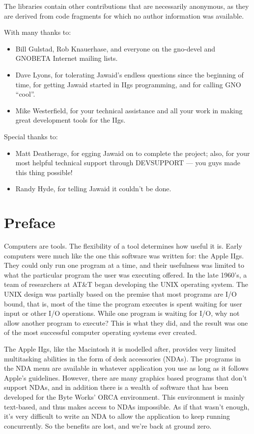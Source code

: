 \documentclass{report}
\begin{document}
The libraries contain other contributions that are necessarily anonymous,
as they are derived from code fragments for which no author information
was available.

With many thanks to:
\begin{itemize}
\item
Bill Gulstad, Rob Knauerhase,
and everyone on the gno-devel and GNOBETA Internet mailing lists.
\item 
Dave Lyons, for tolerating Jawaid's endless
questions since the beginning of time, for getting Jawaid
started in IIgs programming, and for calling GNO ``cool''.
\item
Mike Westerfield, for your
technical assistance and all your work in making great
development tools for the IIgs.
\end{itemize}

Special thanks to:
\begin{itemize}
\item
Matt Deatherage, for egging Jawaid on to
complete the project; also, for your most helpful
technical support through DEVSUPPORT --- you guys made this thing possible!
\item
Randy Hyde, for telling Jawaid it couldn't be done.
\end{itemize}

\chapter{Preface}

Computers are tools. The flexibility of a
tool determines how useful it is. Early computers were much like
the one this software was written for: the Apple IIgs. They could
only run one program at a time, and their usefulness was limited
to what the particular program the user was executing offered. In
the late 1960's, a team of researchers at AT\&T began
developing the UNIX operating system. The UNIX design was
partially based on the premise that most programs are I/O bound,
that is, most of the time the program executes is spent waiting
for user input or other I/O operations. While one program is
waiting for I/O, why not allow another program to execute? This
is what they did, and the result was one of the most successful
computer operating systems ever created.

The Apple IIgs, like the Macintosh it is
modelled after, provides very limited multitasking abilities in
the form of desk accessories (NDAs). The programs in the NDA menu
are available in whatever application you use as long as it
follows Apple's guidelines. However, there are many graphics
based programs that don't support NDAs, and in addition there is
a wealth of software that has been developed for the Byte Works'
ORCA environment. This environment is mainly text-based, and thus
makes access to NDAs impossible. As if that wasn't enough, it's
very difficult to write an NDA to allow the application to keep
running concurrently. So the benefits are lost, and we're back at
ground zero.
\end{document}
